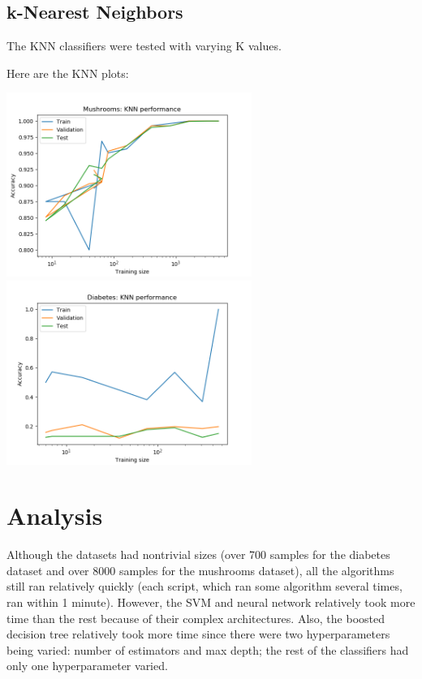 \documentclass[11pt]{article}
\begin{document}
        \subsection{k-Nearest Neighbors}
        The KNN classifiers were tested with varying K values.

        Here are the KNN plots:

        \includegraphics[width=8cm]{mushrooms/mushroom_knn_trainingsize.png}
        \includegraphics[width=8cm]{diabetes/diabetes_knn_trainingsize.png}

        \section{Analysis}

        Although the datasets had nontrivial sizes (over 700 samples for the diabetes dataset and over 8000 samples for the mushrooms dataset), all the algorithms still ran relatively quickly (each script, which ran some algorithm several times, ran within 1 minute). However, the SVM and neural network relatively took more time than the rest because of their complex architectures. Also, the boosted decision tree relatively took more time since there were two hyperparameters being varied: number of estimators and max depth; the rest of the classifiers had only one hyperparameter varied.
\end{document}
